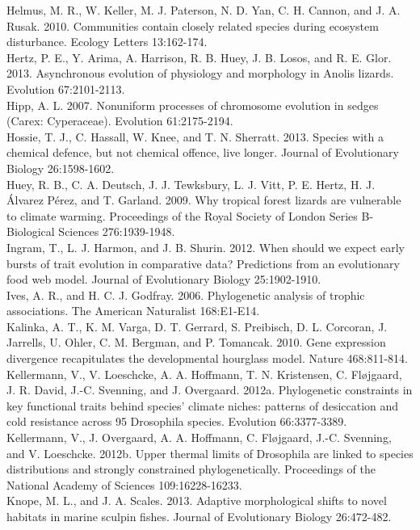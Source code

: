Helmus, M. R., W. Keller, M. J. Paterson, N. D. Yan, C. H. Cannon, and J. A. Rusak. 2010. Communities contain closely related species during ecosystem disturbance. Ecology Letters 13:162-174.\\
Hertz, P. E., Y. Arima, A. Harrison, R. B. Huey, J. B. Losos, and R. E. Glor. 2013. Asynchronous evolution of physiology and morphology in Anolis lizards. Evolution 67:2101-2113.\\
Hipp, A. L. 2007. Nonuniform processes of chromosome evolution in sedges (Carex: Cyperaceae). Evolution 61:2175-2194.\\
Hossie, T. J., C. Hassall, W. Knee, and T. N. Sherratt. 2013. Species with a chemical defence, but not chemical offence, live longer. Journal of Evolutionary Biology 26:1598-1602.\\
Huey, R. B., C. A. Deutsch, J. J. Tewksbury, L. J. Vitt, P. E. Hertz, H. J. Álvarez Pérez, and T. Garland. 2009. Why tropical forest lizards are vulnerable to climate warming. Proceedings of the Royal Society of London Series B-Biological Sciences 276:1939-1948.\\
Ingram, T., L. J. Harmon, and J. B. Shurin. 2012. When should we expect early bursts of trait evolution in comparative data? Predictions from an evolutionary food web model. Journal of Evolutionary Biology 25:1902-1910.\\
Ives, A. R., and H. C. J. Godfray. 2006. Phylogenetic analysis of trophic associations. The American Naturalist 168:E1-E14.\\
Kalinka, A. T., K. M. Varga, D. T. Gerrard, S. Preibisch, D. L. Corcoran, J. Jarrells, U. Ohler, C. M. Bergman, and P. Tomancak. 2010. Gene expression divergence recapitulates the developmental hourglass model. Nature 468:811-814.\\
Kellermann, V., V. Loeschcke, A. A. Hoffmann, T. N. Kristensen, C. Fløjgaard, J. R. David, J.-C. Svenning, and J. Overgaard. 2012a. Phylogenetic constraints in key functional traits behind species' climate niches: patterns of desiccation and cold resistance across 95 Drosophila species. Evolution 66:3377-3389.\\
Kellermann, V., J. Overgaard, A. A. Hoffmann, C. Fløjgaard, J.-C. Svenning, and V. Loeschcke. 2012b. Upper thermal limits of Drosophila are linked to species distributions and strongly constrained phylogenetically. Proceedings of the National Academy of Sciences 109:16228-16233.\\
Knope, M. L., and J. A. Scales. 2013. Adaptive morphological shifts to novel habitats in marine sculpin fishes. Journal of Evolutionary Biology 26:472-482.\\
